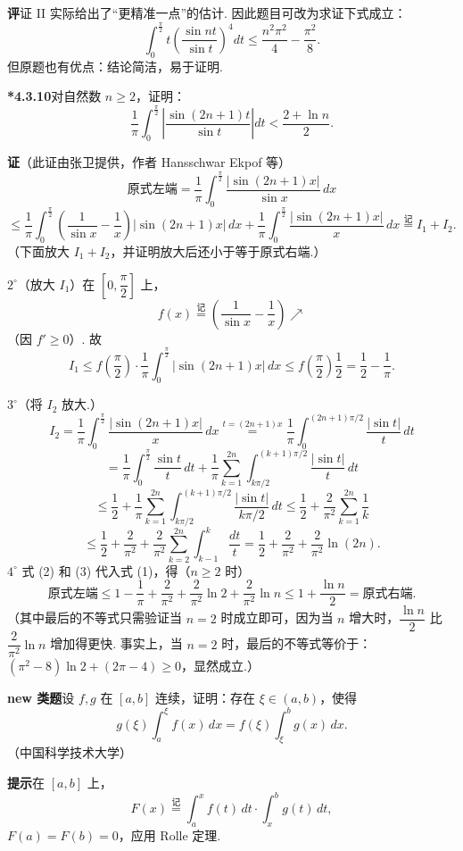 \documentclass[UTF8, 12pt, fontset=fandol, oneside]{ctexart}
\begin{document}
\noindent\textbf{评}\quad 证 II 实际给出了“更精准一点”的估计. 因此题目可改为求证下式成立：
\[
\int_0^{\frac\pi2}t\left(\frac{\sin nt}{\sin t}\right)^4dt
\le\frac{n^2\pi^2}{4}-\frac{\pi^2}{8}.
\]
但原题也有优点：结论简洁，易于证明.

\noindent\textbf{*4.3.10}\quad 对自然数 $n\ge2$，证明：
\[
\frac1\pi\int_0^{\frac\pi2}\left|\frac{\sin(2n+1)t}{\sin t}\right|dt
<\frac{2+\ln n}{2}.
\]

\noindent\textbf{证}\quad （此证由张卫提供，作者 Hansschwar Ekpof 等）
\[
\text{原式左端}=\frac1\pi\int_0^{\frac\pi2}
\frac{|\sin(2n+1)x|}{\sin x}\,dx
\]
\[
\le\frac1\pi\int_0^{\frac\pi2}\left(\frac1{\sin x}-\frac1x\right)
|\sin(2n+1)x|\,dx
+\frac1\pi\int_0^{\frac\pi2}\frac{|\sin(2n+1)x|}{x}\,dx
\stackrel{\text{记}}{=}I_1+I_2.
\tag{1}
\]
（下面放大 $I_1+I_2$，并证明放大后还小于等于原式右端.）

$2^\circ$（放大 $I_1$）在 $\left[0,\dfrac\pi2\right]$ 上，
\[
f(x)\stackrel{\text{记}}{=}\left(\frac1{\sin x}-\frac1x\right)\nearrow
\]
（因 $f'\ge0$）. 故
\[
I_1\le f\left(\frac\pi2\right)\cdot\frac1\pi
\int_0^{\frac\pi2}|\sin(2n+1)x|\,dx
\le f\left(\frac\pi2\right)\frac12
=\frac12-\frac1\pi.
\tag{2}
\]

$3^\circ$（将 $I_2$ 放大.）
\[
I_2=\frac1\pi\int_0^{\frac\pi2}\frac{|\sin(2n+1)x|}{x}\,dx
\stackrel{t=(2n+1)x}{=}
\frac1\pi\int_0^{(2n+1)\pi/2}\frac{|\sin t|}{t}\,dt
\]
\[
=\frac1\pi\int_0^{\frac\pi2}\frac{\sin t}{t}\,dt
+\frac1\pi\sum_{k=1}^{2n}\int_{k\pi/2}^{(k+1)\pi/2}\frac{|\sin t|}{t}\,dt
\]
\[
\le\frac12+\frac1\pi\sum_{k=1}^{2n}\int_{k\pi/2}^{(k+1)\pi/2}\frac{|\sin t|}{k\pi/2}\,dt
\le\frac12+\frac2{\pi^2}\sum_{k=1}^{2n}\frac1k
\]
\[
\le\frac12+\frac2{\pi^2}+\frac2{\pi^2}\sum_{k=2}^{2n}\int_{k-1}^k\frac{dt}{t}
=\frac12+\frac2{\pi^2}+\frac2{\pi^2}\ln(2n).
\tag{3}
\]
$4^\circ$ 式 (2) 和 (3) 代入式 (1)，得（$n\ge2$ 时）
\[
\text{原式左端}\le
1-\frac1\pi+\frac2{\pi^2}+\frac2{\pi^2}\ln2+\frac2{\pi^2}\ln n
\le 1+\frac{\ln n}{2}
=\text{原式右端}.
\]
（其中最后的不等式只需验证当 $n=2$ 时成立即可，因为当 $n$ 增大时，$\dfrac{\ln n}{2}$ 比 $\dfrac2{\pi^2}\ln n$ 增加得更快. 事实上，当 $n=2$ 时，最后的不等式等价于：$(\pi^2-8)\ln2+(2\pi-4)\ge0$，显然成立.）

\noindent\textbf{new 类题}\quad 设 $f,g$ 在 $[a,b]$ 连续，证明：存在 $\xi\in(a,b)$，使得
\[
g(\xi)\int_a^\xi f(x)\,dx=f(\xi)\int_\xi^b g(x)\,dx.
\]
（中国科学技术大学）

\noindent\textbf{提示}\quad 在 $[a,b]$ 上，
\[
F(x)\stackrel{\text{记}}{=}\int_a^x f(t)\,dt\cdot\int_x^b g(t)\,dt,
\]
$F(a)=F(b)=0$，应用 Rolle 定理.
\end{document}
